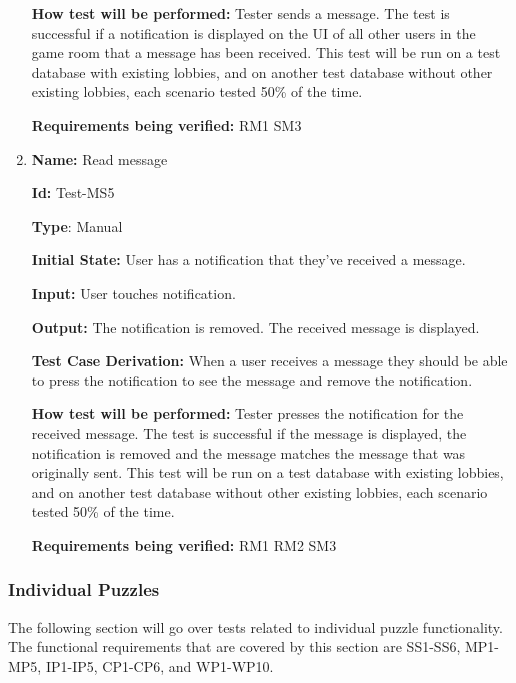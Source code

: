 \documentclass[12pt, titlepage]{article}
\begin{document}
\begin{enumerate}
\textbf{How test will be performed:}
Tester sends a message. The test is successful if a notification is displayed on the UI of all other users in the game room that a message has been received. This test will be run on a test database with existing lobbies, and on another test database without other existing lobbies, each scenario tested 50\% of the time.

\textbf{Requirements being verified: } RM1 SM3

\item{\textbf{Name:} Read message} \label{itm:Test-MS5}

\textbf{Id:} Test-MS5

\textbf{Type}: Manual

\textbf{Initial State:} User has a notification that they've received a message.

\textbf{Input:} User touches notification.

\textbf{Output:} The notification is removed. The received message is displayed.

\textbf{Test Case Derivation:}
When a user receives a message they should be able to press the notification to see the message and remove the notification.

\textbf{How test will be performed:}
Tester presses the notification for the received message. The test is successful if the message is displayed, the notification is removed and the message matches the message that was originally sent. This test will be run on a test database with existing lobbies, and on another test database without other existing lobbies, each scenario tested 50\% of the time.

\textbf{Requirements being verified: } RM1 RM2 SM3

\end{enumerate}

\subsubsection{Individual Puzzles}
The following section will go over tests related to individual puzzle functionality. The functional requirements that are covered by this section are SS1-SS6, MP1-MP5, IP1-IP5, CP1-CP6, and WP1-WP10.
\end{document}
